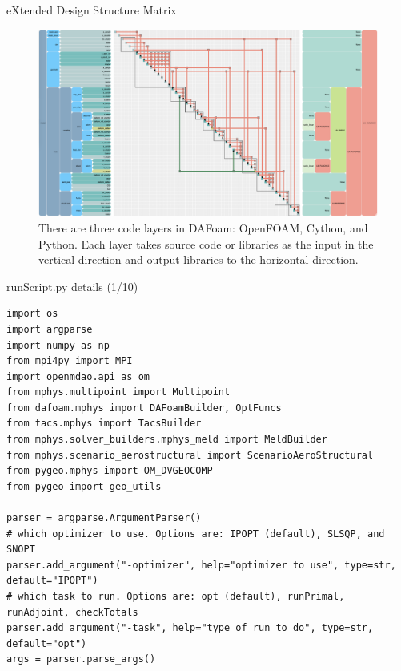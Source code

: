 \documentclass{bredelebeamer}
\begin{document}
\begin{frame}{eXtended Design Structure Matrix}
  \begin{figure}
  \includegraphics[width=1.0\linewidth]{images/aerostruct-n2.png}
  \caption{There are three code layers in DAFoam: OpenFOAM, Cython, and Python. Each layer takes source code or libraries as the input in the vertical direction and output libraries to the horizontal direction.}
  \end{figure}
\end{frame}

\begin{frame}[fragile]{runScript.py details (1/10)}
\scriptsize
\lstset{ language=bash }
\begin{lstlisting}
import os
import argparse
import numpy as np
from mpi4py import MPI
import openmdao.api as om
from mphys.multipoint import Multipoint
from dafoam.mphys import DAFoamBuilder, OptFuncs
from tacs.mphys import TacsBuilder
from mphys.solver_builders.mphys_meld import MeldBuilder
from mphys.scenario_aerostructural import ScenarioAeroStructural
from pygeo.mphys import OM_DVGEOCOMP
from pygeo import geo_utils

parser = argparse.ArgumentParser()
# which optimizer to use. Options are: IPOPT (default), SLSQP, and SNOPT
parser.add_argument("-optimizer", help="optimizer to use", type=str, default="IPOPT")
# which task to run. Options are: opt (default), runPrimal, runAdjoint, checkTotals
parser.add_argument("-task", help="type of run to do", type=str, default="opt")
args = parser.parse_args()
\end{lstlisting}
\normalsize
\end{frame}
\end{document}
